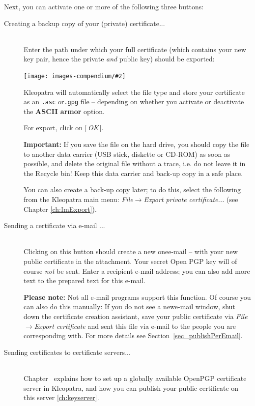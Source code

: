 \documentclass[a4paper,11pt,oneside,openright,titlepage]{scrbook}
\newcommand{\Button}[1]{[\,\textit{#1}\,]}
\newcommand{\Menu}[1]{\textit{#1}}
\newcommand{\Filename}[1]{\small{\texttt{#1}}\normalsize}
\newcommand{\Email}{e-mail}
\newcommand{\IncludeImage}[2][]{
\begin{center}
  \texttt{[image: images-compendium/\#2]}%
\end{center}
}
\begin{document}
\clearpage
Next, you can activate one or more of the following three buttons:

\begin{description}

\item[Creating a backup copy of your (private) certificate...]~\\
    Enter the path under which your full certificate (which contains
    your new key pair, hence the private \textit{and } public key) should be exported:

    \IncludeImage[width=0.5\textwidth]{sc-kleopatra-openpgp-exportSecretKey_en}

    Kleopatra will automatically select the file type and store your
    certificate as an \Filename{.asc} or\Filename{.gpg} file --
    depending on whether you activate or deactivate the \textbf{ASCII
    armor} option.

    For export, click on \Button{OK}.

    \textbf{Important:} If you save the file on the hard drive, you
    should copy the file to another data carrier (USB stick, diskette
    or CD-ROM) as soon as possible, and delete the original file
    without a trace, i.e. do not leave it in the Recycle bin! Keep
    this data carrier and back-up copy in a safe place.

    You can also create a back-up copy later; to do this, select the
    following from the Kleopatra main menu:
    \Menu{File$\rightarrow$Export private certificate...} (see Chapter
    \ref{ch:ImExport}).

\item[Sending a certificate via \Email{} ...]~\\
Clicking on this button should create a new one\Email{} --
    with your new public certificate in the attachment. Your secret
    Open PGP key will of course \textit{not} be sent. Enter a
    recipient \Email{} address; you can also add
    more text to the prepared text for this \Email{}.

    \textbf{Please note:} Not all
   \Email{} programs support this function. Of course you can also do
    this manually: If you do not see a
    new\Email{} window, shut down the
    certificate creation assistant, save your public certificate via
    \Menu{File$\rightarrow$Export certificate} and sent this file
    via \Email{} to
    the people you are corresponding with. For more details see
    Section~\ref{sec_publishPerEmail}.

\item[Sending certificates to certificate servers...]~\\Chapter~ explains how
    to set up a globally available OpenPGP certificate server in Kleopatra,
    and how you can publish your public certificate on this
    server \ref{ch:keyserver}.

\end{description}
\end{document}

